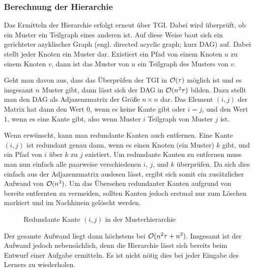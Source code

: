 \subsubsection{Berechnung der Hierarchie}
Das Ermitteln der Hierarchie erfolgt erneut über TGI. Dabei wird überprüft, ob ein Muster 
ein Teilgraph eines anderen ist. Auf diese Weise baut sich ein gerichteter azyklischer Graph 
(engl. directed acyclic graph; kurz DAG) auf. Dabei stellt jeder Knoten ein Muster dar. 
Existiert ein Pfad von einem Knoten $u$ zu einem Knoten $v$, dann ist das Muster von $u$ 
ein Teilgraph des Musters von $v$.

Geht man davon aus, dass das Überprüfen der TGI in 
$\mathcal{O}(\tau)$ möglich ist und es insgesamt $n$ Muster gibt, dann lässt sich der DAG in 
$\mathcal{O}(n^2\tau)$ bilden. Dazu stellt man den DAG als Adjazenzmatrix der Größe $n\times n$ dar. 
Das Element $(i,j)$ der Matrix hat dann den Wert $0$, wenn es keine Kante gibt oder $i=j$, 
und den Wert $1$, wenn es eine Kante gibt, also wenn Muster $i$ Teilgraph von Muster $j$ ist.

Wenn erwünscht, kann man redundante Kanten auch entfernen. Eine Kante $(i,j)$ ist redundant 
genau dann, wenn es einen Knoten (ein Muster) $k$ gibt, und ein Pfad von $i$ über $k$ zu $j$ 
existiert. Um redundante Kanten zu entfernen muss man nun einfach alle paarweise verschiedenen 
$i$, $j$, und $k$ überprüfen. Da sich dies einfach aus der Adjazenzmatrix auslesen lässt, ergibt 
sich somit ein zusätzlicher Aufwand von $\mathcal{O}(n^3)$. Um das Übersehen redundanter Kanten aufgrund 
von bereits entfernten zu vermeiden, sollten Kanten jedoch erstmal nur zum Löschen markiert  
und im Nachhinein gelöscht werden.

\begin{figure}[htb]
\centering
{}\caption{Redundante Kante $(i,j)$ in der Musterhierarchie}
\label{pic:bsp_redunEdge}
\end{figure}

Der gesamte Aufwand liegt 
dann höchstens bei $\mathcal{O}(n^2\tau + n^3)$. Insgesamt ist der Aufwand jedoch nebensächlich, 
denn die Hierarchie lässt sich bereits beim Entwurf einer Aufgabe ermitteln. Es ist nicht 
nötig dies bei jeder Eingabe des Lerners zu wiederholen.

